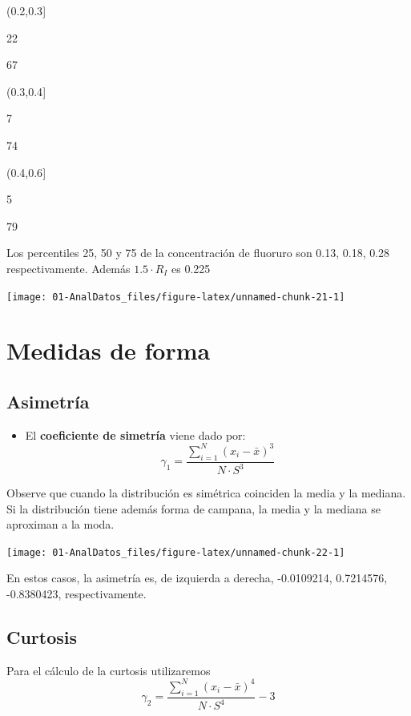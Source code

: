 \documentclass[]{book}
\providecommand{\tightlist}{%
  \setlength{\itemsep}{0pt}\setlength{\parskip}{0pt}}
\theoremstyle{definition}
\theoremstyle{definition}
\theoremstyle{definition}
\theoremstyle{remark}
\begin{document}
(0.2,0.3{]}

22

67

(0.3,0.4{]}

7

74

(0.4,0.6{]}

5

79

Los percentiles 25, 50 y 75 de la concentración de fluoruro son 0.13,
0.18, 0.28 respectivamente. Además \(1.5 \cdot R_I\) es 0.225

\begin{center}\texttt{[image: 01-AnalDatos\_files/figure-latex/unnamed-chunk-21-1]} \end{center}

\section{Medidas de forma}\label{medidas-de-forma}

\subsection{Asimetría}\label{asimetria}

\begin{itemize}
\tightlist
\item
  El \textbf{coeficiente de simetría} viene dado por:
  \[\gamma_1 = \frac{\sum_{i=1}^N (x_i - \bar{x})^3}{N \cdot S^3}\]
\end{itemize}

Observe que cuando la distribución es simétrica coinciden la media y la
mediana. Si la distribución tiene además forma de campana, la media y la
mediana se aproximan a la moda.

\begin{center}\texttt{[image: 01-AnalDatos\_files/figure-latex/unnamed-chunk-22-1]} \end{center}

En estos casos, la asimetría es, de izquierda a derecha, -0.0109214,
0.7214576, -0.8380423, respectivamente.

\subsection{Curtosis}\label{curtosis}

Para el cálculo de la curtosis utilizaremos
\[\gamma_2  =  \frac{\sum_{i=1}^N (x_i - \bar{x})^4}{N \cdot S^4}-3\]
\end{document}
